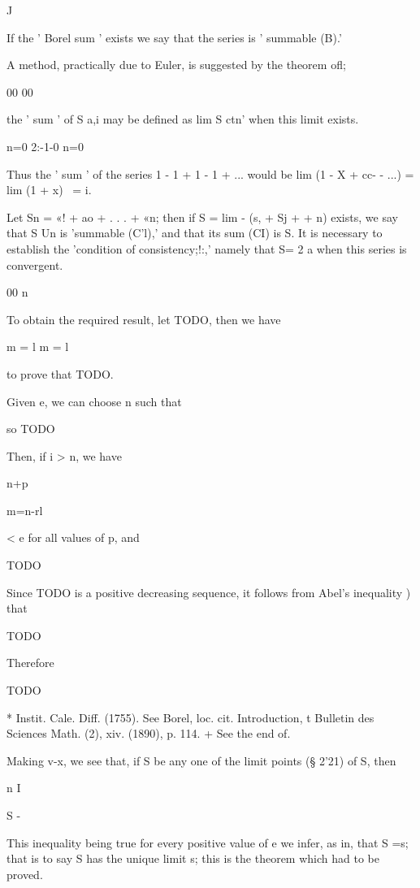 J

If the ' Borel sum ' exists we say that the series is ' summable (B).'

 A method, practically due
to Euler, is suggested by the theorem ofl;

00 00

the ' sum ' of S a,i may be defined as lim S ctn' when this limit
exists.

n=0 2:-1-0 n=0

Thus the ' sum ' of the series 1 - 1 + 1 - 1 + ... would be lim (1 - X
+ cc- - ...) = lim (1 + x)~ = i.


Let Sn = «! + ao + . . . + «n; then if S = lim - (s, + Sj +    +
n) exists, we say that S Un is 'summable (C'l),' and that its sum
(CI) is S. It is necessary to establish the 'condition of
consistency;!:,' namely that S= 2 a when this series is convergent.

00 n

To obtain the required result, let TODO, then we have

m = l m = l

to prove that TODO.

Given e, we can choose n such that

so TODO

Then, if i > n, we have

n+p


m=n-rl

< e for all values of p, and

TODO

Since TODO is a positive decreasing sequence, it follows from Abel's
inequality ) that

TODO

Therefore

TODO

* Instit. Cale. Diff. (1755). See Borel, loc. cit. Introduction, t
Bulletin des Sciences Math. (2), xiv. (1890), p. 114. + See the end of.

%
%
Making v-x, we see that, if S be any one of the limit points (§
2'21) of S, then

n I

S - %

This inequality being true for every positive value of e we infer, as
in, that S =s; that is to say S has the unique limit s;
this is the theorem which had to be proved.

